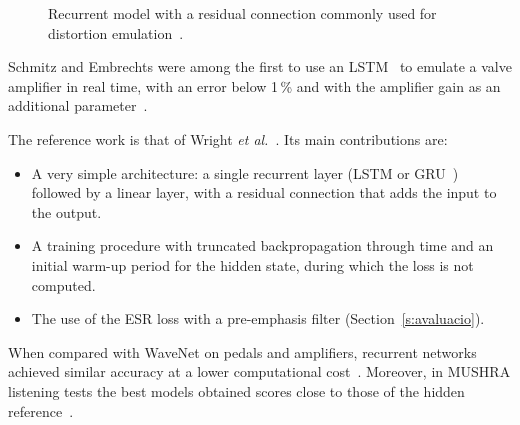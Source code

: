 \documentclass[ENG]{TFUOC}%
\begin{document}
\begin{figure}[!htbp]
\centering
{}
\caption{Recurrent model with a residual connection commonly used for distortion emulation~\cite{wright2019}.}
\label{fig:rnn}
\end{figure}

Schmitz and Embrechts were among the first to use an LSTM~\cite{hochreiter1997} to emulate a valve amplifier in real time, with an error below 1\,\% and with the amplifier gain as an additional parameter~\cite{schmitz2018}.

The reference work is that of Wright \emph{et al.}~\cite{wright2019,wright2020}. Its main contributions are:
\begin{itemize}[nosep]
    \item A very simple architecture: a single recurrent layer (LSTM or GRU~\cite{cho2014}) followed by a linear layer, with a residual connection that adds the input to the output.
    \item A training procedure with truncated backpropagation through time and an initial warm-up period for the hidden state, during which the loss is not computed.
    \item The use of the ESR loss with a pre-emphasis filter (Section~\ref{s:avaluacio}).
\end{itemize}
When compared with WaveNet on pedals and amplifiers, recurrent networks achieved similar accuracy at a lower computational cost~\cite{wright2019}. Moreover, in MUSHRA listening tests the best models obtained scores close to those of the hidden reference~\cite{wright2020}.
\end{document}
